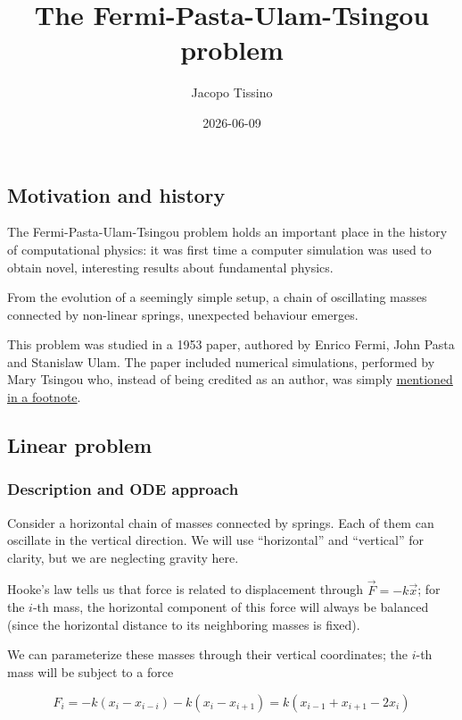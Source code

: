 \documentclass[
]{article}
\title{The Fermi-Pasta-Ulam-Tsingou problem}
\author{Jacopo Tissino}
\date{2026-06-09}
\begin{document}
\maketitle


\subsection{Motivation and history}\label{motivation-and-history}

The Fermi-Pasta-Ulam-Tsingou problem holds an important place in the
history of computational physics: it was first time a computer
simulation was used to obtain novel, interesting results about
fundamental physics.

From the evolution of a seemingly simple setup, a chain of oscillating
masses connected by non-linear springs, unexpected behaviour emerges.

This problem was studied in a 1953 paper, authored by Enrico Fermi, John
Pasta and Stanislaw Ulam. The paper included numerical simulations,
performed by Mary Tsingou who, instead of being credited as an author,
was simply
\href{https://web.archive.org/web/20240929141604/https://discover.lanl.gov/publications/national-security-science/2020-winter/we-thank-miss-mary-tsingou/}{mentioned
in a footnote}.

\subsection{Linear problem}\label{linear-problem}

\subsubsection{Description and ODE
approach}\label{description-and-ode-approach}

Consider a horizontal chain of masses connected by springs. Each of them
can oscillate in the vertical direction. We will use ``horizontal'' and
``vertical'' for clarity, but we are neglecting gravity here.

Hooke's law tells us that force is related to displacement through
\(\vec{F} = -k \vec{x}\); for the \(i\)-th mass, the horizontal
component of this force will always be balanced (since the horizontal
distance to its neighboring masses is fixed).

We can parameterize these masses through their vertical coordinates; the
\(i\)-th mass will be subject to a force

\[ F_i = -k (x_{i} - x_{i-i}) - k (x_{i} - x_{i+1})
= k ( x_{i-1} + x_{i+1} - 2 x_i )
\]
\end{document}

